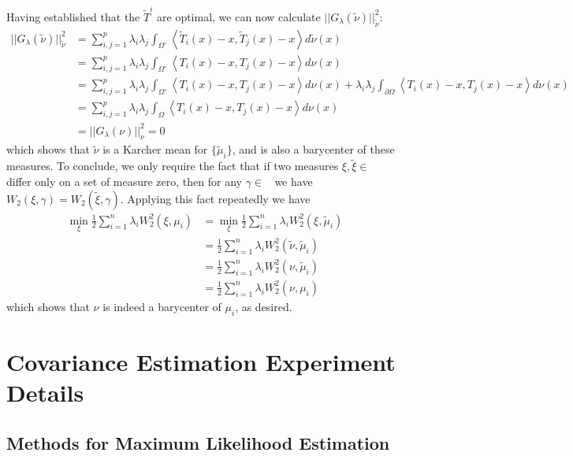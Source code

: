 \documentclass[nohyperref]{article}
\DeclareMathOperator{\Pac}{\mathcal{P}_{2,ac}(\mathbb{R}^d)}
\theoremstyle{definition}
\begin{document}
Having established that the $\tilde{T}^i$ are optimal, we can now calculate $||G_\lambda(\tilde{\nu})||_{\tilde{\nu}}^2$:
\begin{align*}
    ||G_\lambda(\tilde{\nu})||_{\tilde{\nu}}^2 &= \sum_{i,j=1}^p \lambda_i\lambda_j \int_{\Omega^\circ} \left \langle \tilde{T}_i(x) - x, \tilde{T}_j(x) - x \right \rangle d\tilde{\nu}(x) \\
    &= \sum_{i,j=1}^p \lambda_i\lambda_j\int_{\Omega^\circ} \left \langle T_i(x) - x, T_j(x) - x \right \rangle d\nu(x) \\
    &= \sum_{i,j=1}^p \lambda_i\lambda_j\int_{\Omega^\circ} \left \langle T_i(x) - x, T_j(x) - x \right \rangle d\nu(x) + \lambda_i\lambda_j \int_{\partial \Omega} \left \langle T_i(x) - x, T_j(x) - x \right \rangle d\nu(x) \\
    &= \sum_{i,j=1}^p \lambda_i\lambda_j \int_{\Omega} \left \langle T_i(x) - x, T_j(x) - x \right \rangle d\nu(x) \\
    &= ||G_\lambda(\nu)||_{\nu}^2 = 0
\end{align*}
which shows that $\tilde{\nu}$ is a Karcher mean for $\{\tilde{\mu}_i\}$, and is also a barycenter of these measures. 
To conclude, we only require the fact that if two measures $\xi,\tilde{\xi} \in \Pac$ differ only on a set of measure zero, then for any $\gamma \in \Pac$ we have $W_2(\xi, \gamma) = W_2(\tilde{\xi}, \gamma)$. Applying this fact repeatedly we have 
\begin{align*}
    \min_{\xi} \frac{1}{2}\sum_{i=1}^n  \lambda_i W_2^2(\xi, \mu_i) &= \min_{\xi} \frac{1}{2}\sum_{i=1}^n  \lambda_i W_2^2(\xi, \tilde{\mu}_i) \\
    &= \frac{1}{2}\sum_{i=1}^n \lambda_i W_2^2(\tilde{\nu}, \tilde{\mu}_i) \\
    &= \frac{1}{2}\sum_{i=1}^n \lambda_i W_2^2(\nu, \tilde{\mu}_i) \\
    &= \frac{1}{2}\sum_{i=1}^n \lambda_i W_2^2(\nu, \mu_i) 
\end{align*}
which shows that $\nu$ is indeed a barycenter of $\mu_i$, as desired.

\section{Covariance Estimation Experiment Details} \label{SM:Covariance}

\subsection{Methods for Maximum Likelihood Estimation}
\end{document}
